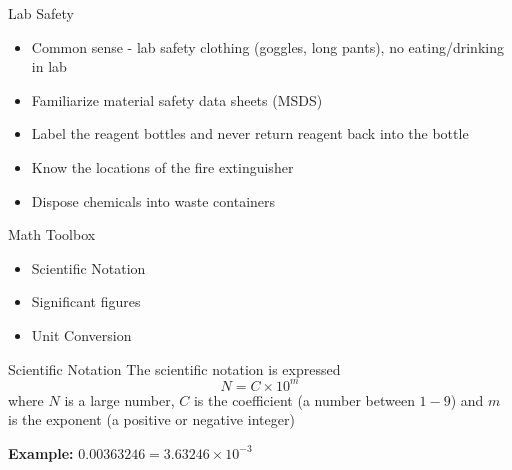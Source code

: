 \documentclass[11pt]{beamer}
\begin{document}
\begin{frame}{Lab Safety}
  \begin{itemize}
  \item Common sense - lab safety clothing (goggles, long pants),
    no eating/drinking in lab
  \item Familiarize material safety data sheets (MSDS)
  \item Label the reagent bottles and never return reagent back
    into the bottle
  \item Know the locations of the fire extinguisher
  \item Dispose chemicals into waste containers
  \end{itemize}
\end{frame}

\begin{frame}{Math Toolbox}
  \begin{itemize}
  \item Scientific Notation
  \item Significant figures
  \item Unit Conversion
  \end{itemize}
\end{frame}

\begin{frame}{Scientific Notation}
  The scientific notation is expressed
  \begin{equation}
    N = C \times 10^m
  \end{equation}
  where $N$ is a large number, $C$ is the coefficient (a number between $1-9$)
  and $m$ is the exponent (a positive or negative integer)

  \textbf{Example:} $0.00363246 = 3.63246 \times 10^{-3}$

\end{frame}
\end{document}
